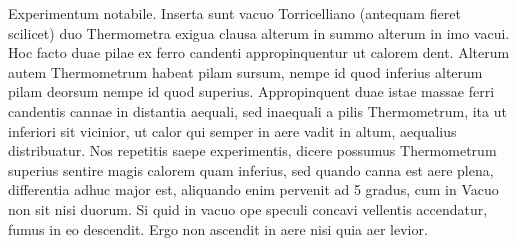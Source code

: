 \pstart {} Experimentum notabile. Inserta sunt vacuo Torricelliano\protect{} (antequam fieret scilicet) duo Thermometra\protect{} exigua clausa alterum in summo alterum in imo vacui. Hoc facto duae pilae\protect{} ex ferro\protect{} candenti appropinquentur ut calorem\protect{} dent.  Alterum autem Thermometrum\protect{} habeat pilam\protect{} sursum, nempe  id quod inferius alterum pilam\protect{} deorsum nempe id quod superius.  Appropinquent duae istae massae\protect{} ferri\protect{} candentis cannae in  distantia aequali, sed inaequali a pilis Thermometrum\protect{}, ita ut  inferiori sit vicinior, ut calor\protect{} qui semper in aere vadit in altum,  aequalius distribuatur. Nos repetitis saepe experimentis, dicere possumus Thermometrum\protect{} superius sentire magis calorem quam inferius, sed quando  canna est aere plena, differentia adhuc major est, aliquando enim pervenit  ad 5 gradus, cum in Vacuo non sit nisi duorum.\pend \clearpage \pstart {} Si quid in vacuo ope speculi concavi\protect{} vellentis\protect{} accendatur, fumus in eo descendit. Ergo non ascendit in aere nisi quia aer levior.\pend 
